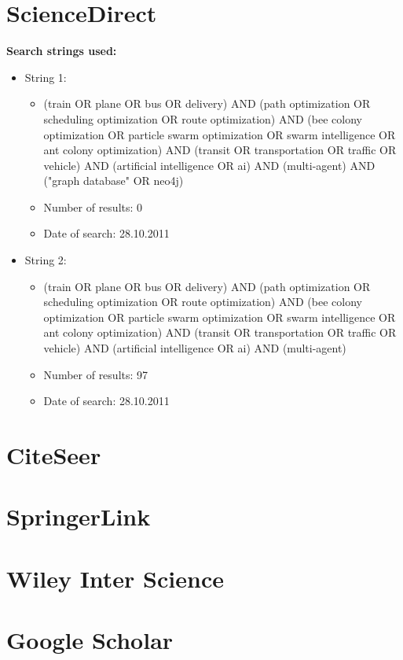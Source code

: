 
\section{ScienceDirect}
\textbf{Search strings used:}
\begin{itemize}
\item String 1:
\begin{itemize}
\item (train OR plane OR bus OR delivery) AND (path optimization OR scheduling optimization OR route optimization) AND (bee colony optimization OR particle swarm optimization OR swarm intelligence OR ant colony optimization) AND (transit OR transportation OR traffic OR vehicle) AND (artificial intelligence OR ai) AND (multi-agent) AND ("graph database" OR neo4j)
\item Number of results: 0
\item Date of search: 28.10.2011
\end{itemize}
\item String 2:
\begin{itemize}
\item (train OR plane OR bus OR delivery) AND (path optimization OR scheduling optimization OR route optimization) AND (bee colony optimization OR particle swarm optimization OR swarm intelligence OR ant colony optimization) AND (transit OR transportation OR traffic OR vehicle) AND (artificial intelligence OR ai) AND (multi-agent)
\item Number of results: 97
\item Date of search: 28.10.2011
\end{itemize}
\end{itemize}


\section{CiteSeer}

\section{SpringerLink}

\section{Wiley Inter Science}

\section{Google Scholar}